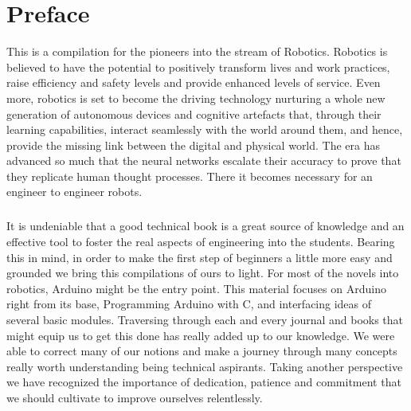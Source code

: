 \chapter*{Preface}
\begin{fullwidth}
	\begin{doublespace}
		\justify
		\par This is a compilation for the pioneers into the stream of Robotics. Robotics is believed to have the potential to positively transform lives and work practices, raise efficiency and safety levels and provide enhanced levels of service. Even more, robotics is set to become the driving technology nurturing a whole new generation of autonomous devices and cognitive artefacts that, through their learning capabilities, interact seamlessly with the world around them, and hence, provide the missing link between the digital and physical world. The era has advanced so much that the neural networks escalate their accuracy to prove that they replicate human thought processes. There it becomes necessary for an engineer to engineer robots.
		\vspace{5mm}
		\paragraph{ } It is undeniable that a good technical book is a great source of knowledge and an effective tool to foster the real aspects of engineering into the students. Bearing this in mind, in order to make the first step of beginners a little more easy and grounded we bring this compilations of ours to light. For most of the novels into robotics, Arduino might be the entry point. This material focuses on Arduino right from its base, Programming Arduino with C, and interfacing ideas of several basic modules. Traversing through each and every journal and books that might equip us to get this done has really added up to our knowledge. We were able to correct many of our notions and make a journey through many concepts really worth understanding being technical aspirants. Taking another perspective we have recognized the importance of dedication, patience and commitment that we should cultivate to improve ourselves relentlessly.
	\end{doublespace}

\end{fullwidth}